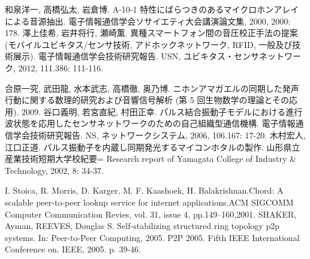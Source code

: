 \begin{thebibliography}{99}
 和泉洋一, 高橋弘太, 岩倉博. A-10-1 特性にばらつきのあるマイクロホンアレイによる音源抽出. 電子情報通信学会ソサイエティ大会講演論文集, 2000, 2000: 178.
 澤上佳希, 岩井将行, 瀬崎薫. 異種スマートフォン間の音圧校正手法の提案 (モバイルユビキタス/センサ技術, アドホックネットワーク, RFID, 一般及び技術展示). 電子情報通信学会技術研究報告. USN, ユビキタス・センサネットワーク, 2012, 111.386: 111-116.

 合原一究, 武田龍, 水本武志, 高橋徹, 奥乃博. ニホンアマガエルの同期した発声行動に関する数理的研究および音響信号解析 (第 5 回生物数学の理論とその応用). 2009.
 谷口義明, 若宮直紀, 村田正幸. パルス結合振動子モデルにおける進行波状態を応用したセンサネットワークのための自己組織型通信機構. 電子情報通信学会技術研究報告. NS, ネットワークシステム, 2006, 106.167: 17-20.
 木村宏人, 江口正道. パルス振動子を内蔵し同期発光するマイコンホタルの製作. 山形県立産業技術短期大学校紀要= Research report of Yamagata College of Industry \& Technology, 2002, 8: 34-37.

I. Stoica, R. Morris, D. Karger, M. F. Kaashoek, H. Balakrishnan.Chord: A scalable peer-to-peer lookup service for internet applications.ACM SIGCOMM Computer Communication Revies, vol. 31, issue 4, pp.149--160,2001.
 SHAKER, Ayman, REEVES, Douglas S. Self-stabilizing structured ring topology p2p systems. In: Peer-to-Peer Computing, 2005. P2P 2005. Fifth IEEE International Conference on. IEEE, 2005. p. 39-46.

\begin{comment}
\bibitem{小松崎俊彦} 小松崎俊彦, 佐藤秀紀, 岩田佳雄. 502 CA によるホタル群集の発光同期シミュレーション (OS 5-1 振動・制御問題)(オーガナイズドセッション 5: 機械の動的問題). 講演論文集, 2001, 2001.38: 135-136.
\bibitem{鯰江一也} 鯰江一也, 栗田裕, 松村雄一. 723 ホタルの集団同期発光を模擬した相互引込みの実現. In: Dynamics \& Design Conference. 一般社団法人日本機械学会, 2007.
\bibitem{伊藤大輔} 伊藤大輔, et al. 周期外力を加えた電子ホタルにおける分岐と同期現象. 電子情報通信学会技術研究報告. NLP, 非線形問題, 2012, 111.395: 81-86.
\end{comment}








\end{thebibliography}
